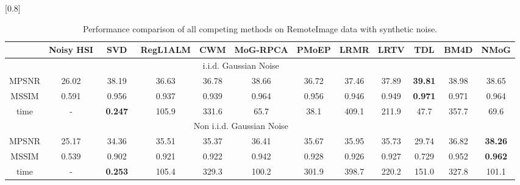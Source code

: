 \documentclass[journal]{IEEEtran}
\begin{document}
		\begin{table*}
			\caption{\label{table3} Performance comparison of all competing methods on RemoteImage data with synthetic noise.}
			\setlength{\tabcolsep}{4pt}
			\begin{center}
				{\small
					\scalebox{0.9}[0.8]{
						\begin{tabular}{c c c c c c c c c c c c}
								\toprule
								& Noisy HSI  & ~SVD~  & RegL1ALM & CWM & MoG-RPCA	& PMoEP & LRMR & LRTV &TDL & BM4D & NMoG\\
								\midrule
								\multicolumn{11}{c}{i.i.d. Gaussian Noise}\\ \hline
								MPSNR & 26.02   & 38.19  & 36.63 & 36.78    & 38.66 & 36.72  & 37.46    & 37.89 & \bf{39.81}   & 38.98 & 38.65\\
								MSSIM &  0.591    & 0.956 & 0.937    & 0.939 & 0.964  &  0.956 & 0.946  & 0.949   & {\bf{0.971}} &0.971 & 0.964 \\
								time & 	- & \bf{0.247}  	& 105.9 & 331.6	& 65.7	& 38.1 	& 409.1 & 211.9 & 47.7 	& 357.7    & 69.6  \\ \hline
								\multicolumn{11}{c}{Non i.i.d. Gaussian Noise}\\ \hline
								MPSNR & 25.17  & 34.36   & 35.51 & 35.37    & 36.41 & 35.67  &  35.95  & 35.73 & 29.74  & 36.82 & {\bf{38.26}}\\
								MSSIM & 0.539   & 0.902 & 0.921  & 0.922 & 0.942  & 0.928 & 0.926 & 0.927 & 0.729 &0.952 & {\bf{0.962}} \\
								time & 	- & \bf{0.253} 	& 105.4 &329.3	&100.2	& 301.9 & 398.7 &220.2 & 151.0 	& 327.8  & 101.1	
								\\
								

\end{tabular}}}
\end{center}
\end{table*}
\end{document}
